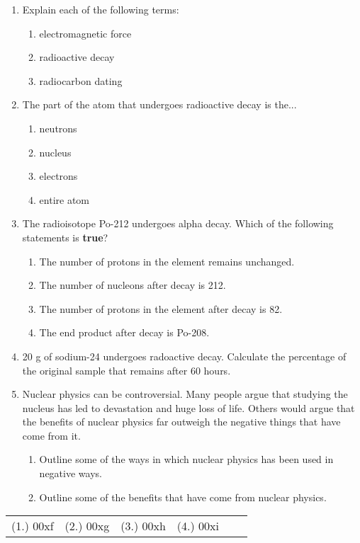 \begin{eocexercises}{}

\begin{enumerate}
\item{Explain each of the following terms:}
\begin{enumerate}
\item{electromagnetic force}
\item{radioactive decay}
\item{radiocarbon dating}
\end{enumerate}

\item{The part of the atom that undergoes radioactive decay is the...
\begin{enumerate}
\item{neutrons}
\item{nucleus}
\item{electrons}
\item{entire atom}
\end{enumerate}
}
\item{The radioisotope Po-212 undergoes alpha decay. Which of the following statements is \textbf{true}?
\begin{enumerate}
\item{The number of protons in the element remains unchanged.}
\item{The number of nucleons after decay is 212.}
\item{The number of protons in the element after decay is 82.}
\item{The end product after decay is Po-208.}
\end{enumerate}
}


\item{20 g of sodium-24 undergoes radoactive decay. Calculate the percentage of the original sample that remains after 60 hours.}

\item{Nuclear physics can be controversial. Many people argue that studying the nucleus has led to devastation and huge loss of life. Others would argue that the benefits of nuclear physics far outweigh the negative things that have come from it.}
\begin{enumerate}
\item{Outline some of the ways in which nuclear physics has been used in negative ways.}
\item{Outline some of the benefits that have come from nuclear physics.}
\end{enumerate}
\end{enumerate}

\practiceinfo

\begin{tabular}[h]{cccccc}
(1.) 00xf & (2.) 00xg & (3.) 00xh & (4.) 00xi & 
 \end{tabular}
\end{eocexercises}









